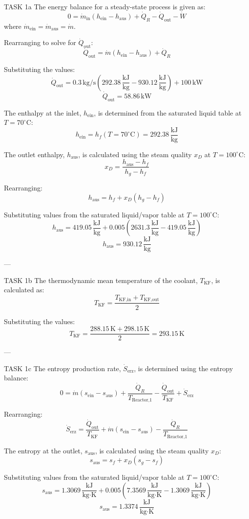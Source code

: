 TASK 1a  
The energy balance for a steady-state process is given as:  
\[
0 = \dot{m}_{\text{in}} \left( h_{\text{ein}} - h_{\text{aus}} \right) + \dot{Q}_R - \dot{Q}_{\text{out}} - \dot{W}
\]  
where \( \dot{m}_{\text{ein}} = \dot{m}_{\text{aus}} = \dot{m} \).  

Rearranging to solve for \( \dot{Q}_{\text{out}} \):  
\[
\dot{Q}_{\text{out}} = \dot{m} \left( h_{\text{ein}} - h_{\text{aus}} \right) + \dot{Q}_R
\]  

Substituting the values:  
\[
\dot{Q}_{\text{out}} = 0.3 \, \text{kg/s} \left( 292.38 \, \frac{\text{kJ}}{\text{kg}} - 930.12 \, \frac{\text{kJ}}{\text{kg}} \right) + 100 \, \text{kW}
\]  
\[
\dot{Q}_{\text{out}} = 58.86 \, \text{kW}
\]  

The enthalpy at the inlet, \( h_{\text{ein}} \), is determined from the saturated liquid table at \( T = 70^\circ\text{C} \):  
\[
h_{\text{ein}} = h_f(T = 70^\circ\text{C}) = 292.38 \, \frac{\text{kJ}}{\text{kg}}
\]  

The outlet enthalpy, \( h_{\text{aus}} \), is calculated using the steam quality \( x_D \) at \( T = 100^\circ\text{C} \):  
\[
x_D = \frac{h_{\text{aus}} - h_f}{h_g - h_f}
\]  

Rearranging:  
\[
h_{\text{aus}} = h_f + x_D \left( h_g - h_f \right)
\]  

Substituting values from the saturated liquid/vapor table at \( T = 100^\circ\text{C} \):  
\[
h_{\text{aus}} = 419.05 \, \frac{\text{kJ}}{\text{kg}} + 0.005 \left( 2631.3 \, \frac{\text{kJ}}{\text{kg}} - 419.05 \, \frac{\text{kJ}}{\text{kg}} \right)
\]  
\[
h_{\text{aus}} = 930.12 \, \frac{\text{kJ}}{\text{kg}}
\]  

---

TASK 1b  
The thermodynamic mean temperature of the coolant, \( T_{\text{KF}} \), is calculated as:  
\[
T_{\text{KF}} = \frac{T_{\text{KF,in}} + T_{\text{KF,out}}}{2}
\]  

Substituting the values:  
\[
T_{\text{KF}} = \frac{288.15 \, \text{K} + 298.15 \, \text{K}}{2} = 293.15 \, \text{K}
\]  

---

TASK 1c  
The entropy production rate, \( \dot{S}_{\text{erz}} \), is determined using the entropy balance:  
\[
0 = \dot{m} \left( s_{\text{ein}} - s_{\text{aus}} \right) + \frac{\dot{Q}_R}{T_{\text{Reactor,1}}} - \frac{\dot{Q}_{\text{out}}}{T_{\text{KF}}} + \dot{S}_{\text{erz}}
\]  

Rearranging:  
\[
\dot{S}_{\text{erz}} = \frac{\dot{Q}_{\text{out}}}{T_{\text{KF}}} + \dot{m} \left( s_{\text{ein}} - s_{\text{aus}} \right) - \frac{\dot{Q}_R}{T_{\text{Reactor,1}}}
\]  

The entropy at the outlet, \( s_{\text{aus}} \), is calculated using the steam quality \( x_D \):  
\[
s_{\text{aus}} = s_f + x_D \left( s_g - s_f \right)
\]  

Substituting values from the saturated liquid/vapor table at \( T = 100^\circ\text{C} \):  
\[
s_{\text{aus}} = 1.3069 \, \frac{\text{kJ}}{\text{kg·K}} + 0.005 \left( 7.3569 \, \frac{\text{kJ}}{\text{kg·K}} - 1.3069 \, \frac{\text{kJ}}{\text{kg·K}} \right)
\]  
\[
s_{\text{aus}} = 1.3374 \, \frac{\text{kJ}}{\text{kg·K}}
\]  

